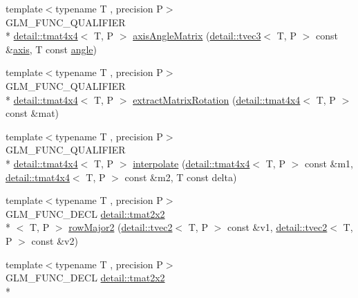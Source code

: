 \begin{DoxyCompactItemize}
\item 
{\footnotesize template$<$typename T , precision P$>$ }\\G\-L\-M\-\_\-\-F\-U\-N\-C\-\_\-\-Q\-U\-A\-L\-I\-F\-I\-E\-R \\*
\hyperlink{structglm_1_1detail_1_1tmat4x4}{detail\-::tmat4x4}$<$ T, P $>$ \hyperlink{group__gtx__matrix__interpolation_gafc6982aa7c8e8198b21f038f51fc4b90}{axis\-Angle\-Matrix} (\hyperlink{structglm_1_1detail_1_1tvec3}{detail\-::tvec3}$<$ T, P $>$ const \&\hyperlink{group__gtc__quaternion_ga8eef9f8c3f2e4836dccf09df975b20fb}{axis}, T const \hyperlink{group__gtc__quaternion_ga23a3fc7ada5bbb665ff84c92c6e0542c}{angle})
\item 
{\footnotesize template$<$typename T , precision P$>$ }\\G\-L\-M\-\_\-\-F\-U\-N\-C\-\_\-\-Q\-U\-A\-L\-I\-F\-I\-E\-R \\*
\hyperlink{structglm_1_1detail_1_1tmat4x4}{detail\-::tmat4x4}$<$ T, P $>$ \hyperlink{group__gtx__matrix__interpolation_gacb1e3e76c1710d89a1852d87d58c021e}{extract\-Matrix\-Rotation} (\hyperlink{structglm_1_1detail_1_1tmat4x4}{detail\-::tmat4x4}$<$ T, P $>$ const \&mat)
\item 
{\footnotesize template$<$typename T , precision P$>$ }\\G\-L\-M\-\_\-\-F\-U\-N\-C\-\_\-\-Q\-U\-A\-L\-I\-F\-I\-E\-R \\*
\hyperlink{structglm_1_1detail_1_1tmat4x4}{detail\-::tmat4x4}$<$ T, P $>$ \hyperlink{group__gtx__matrix__interpolation_gad7dbb702234767be1b4d3c191a2327ac}{interpolate} (\hyperlink{structglm_1_1detail_1_1tmat4x4}{detail\-::tmat4x4}$<$ T, P $>$ const \&m1, \hyperlink{structglm_1_1detail_1_1tmat4x4}{detail\-::tmat4x4}$<$ T, P $>$ const \&m2, T const delta)
\item 
{\footnotesize template$<$typename T , precision P$>$ }\\G\-L\-M\-\_\-\-F\-U\-N\-C\-\_\-\-D\-E\-C\-L \hyperlink{structglm_1_1detail_1_1tmat2x2}{detail\-::tmat2x2}\\*
$<$ T, P $>$ \hyperlink{group__gtx__matrix__major__storage_ga63d72819ad07f4f875a0565f1462652b}{row\-Major2} (\hyperlink{structglm_1_1detail_1_1tvec2}{detail\-::tvec2}$<$ T, P $>$ const \&v1, \hyperlink{structglm_1_1detail_1_1tvec2}{detail\-::tvec2}$<$ T, P $>$ const \&v2)
\item 
{\footnotesize template$<$typename T , precision P$>$ }\\G\-L\-M\-\_\-\-F\-U\-N\-C\-\_\-\-D\-E\-C\-L \hyperlink{structglm_1_1detail_1_1tmat2x2}{detail\-::tmat2x2}\\*

\end{DoxyCompactItemize}
